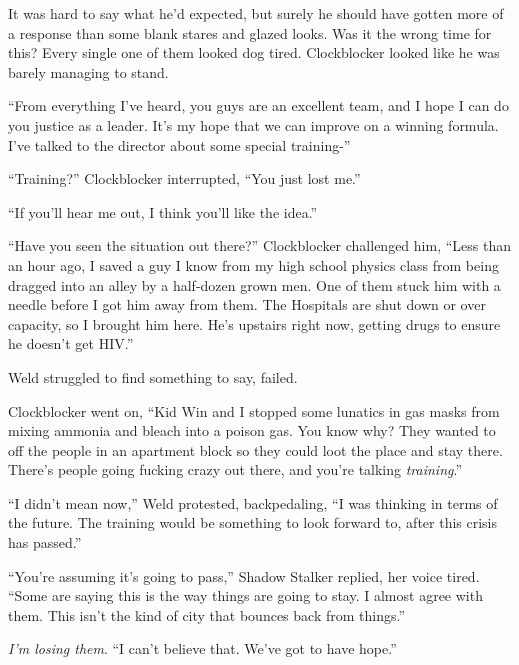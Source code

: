 It was hard to say what he'd expected, but surely he should have gotten more of a response than some blank stares and glazed looks.  Was it the wrong time for this?  Every single one of them looked dog tired.  Clockblocker looked like he was barely managing to stand.



``From everything I've heard, you guys are an excellent team, and I hope I can do you justice as a leader.  It's my hope that we can improve on a winning formula.  I've talked to the director about some special training-''



``Training?'' Clockblocker interrupted, ``You just lost me.''



``If you'll hear me out, I think you'll like the idea.''



``Have you seen the situation out there?'' Clockblocker challenged him, ``Less than an hour ago, I saved a guy I know from my high school physics class from being dragged into an alley by a half-dozen grown men.  One of them stuck him with a needle before I got him away from them.  The Hospitals are shut down or over capacity, so I brought him here.  He's upstairs right now, getting drugs to ensure he doesn't get HIV.''



Weld struggled to find something to say, failed.



Clockblocker went on, ``Kid Win and I stopped some lunatics in gas masks from mixing ammonia and bleach into a poison gas.  You know why?  They wanted to off the people in an apartment block so they could loot the place and stay there.  There's people going fucking crazy out there, and you're talking \emph{training}.''



``I didn't mean now,'' Weld protested, backpedaling, ``I was thinking in terms of the future.  The training would be something to look forward to, after this crisis has passed.''



``You're assuming it's going to pass,'' Shadow Stalker replied, her voice tired.  ``Some are saying this is the way things are going to stay.  I almost agree with them.  This isn't the kind of city that bounces back from things.''



\emph{I'm losing them}.  ``I can't believe that.  We've got to have hope.''



